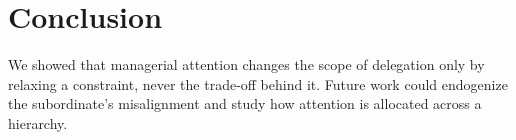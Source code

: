 \section{Conclusion}
\label{sec:conclusion}

We showed that managerial attention changes the scope of delegation only by relaxing a constraint, never the trade-off behind it. Future work could endogenize the subordinate's misalignment and study how attention is allocated across a hierarchy.
